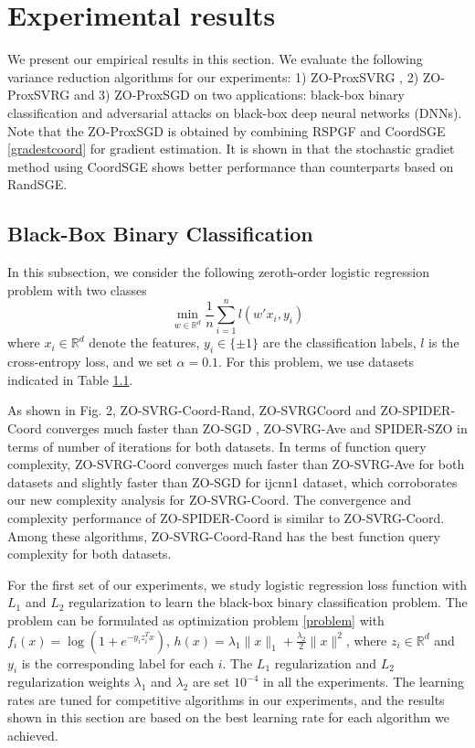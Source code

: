 \documentclass{article}
\newcommand*{\R}{\mathbb{R}}
\theoremstyle{definition}
\theoremstyle{remark}
\begin{document}
\section{Experimental results}

We present our empirical results in this section. We evaluate the following variance reduction algorithms for our experiments: 1) ZO-ProxSVRG \cite{Johnson12}, 2) ZO-ProxSVRG\cite{pedregosa2017breaking} and 3) ZO-ProxSGD on two applications: black-box binary classification and adversarial attacks on black-box deep neural networks
(DNNs). Note that the ZO-ProxSGD is obtained by combining RSPGF and CoordSGE \eqref{gradestcoord} for gradient estimation. It is shown in \cite{huang2019faster} that the stochastic gradiet method using CoordSGE shows better performance than counterparts based on RandSGE.


\subsection{Black-Box Binary Classification}
{\color{Melon}
In this subsection, we consider the following zeroth-order logistic regression problem with two classes 
\[
\min_{w\in\R^d} \frac{1}{n}\sum_{i=1}^n l(w'x_i, y_i)
\]
where $x_i\in\R^d$ denote the features, $y_i\in\{\pm 1\}$ are the classification labels, $l$ is the cross-entropy loss, and we
set $\alpha = 0.1$. For this problem, we use datasets indicated in Table \ref{}. 

As shown in Fig. 2, ZO-SVRG-Coord-Rand, ZO-SVRGCoord
and ZO-SPIDER-Coord converges much faster than
ZO-SGD , ZO-SVRG-Ave and SPIDER-SZO in terms of
number of iterations for both datasets. In terms of function
query complexity, ZO-SVRG-Coord converges much faster
than ZO-SVRG-Ave for both datasets and slightly faster
than ZO-SGD for ijcnn1 dataset, which corroborates our
new complexity analysis for ZO-SVRG-Coord. The convergence
and complexity performance of ZO-SPIDER-Coord
is similar to ZO-SVRG-Coord. Among these algorithms,
ZO-SVRG-Coord-Rand has the best function query complexity
for both datasets.
}
For the first set of our experiments, we study logistic regression loss function with $L_1$ and $L_2$ regularization {\color{Green} to learn the black-box binary classification problem}. The problem can be formulated as optimization problem \eqref{problem} with $f_i(x) = \log(1+e^{-y_iz^T_i{x}})$, $h(x) = \lambda_1\|{x}\|_1 + \frac{\lambda_2}{2}\|{x}\|^2$, where $z_i\in\R^d$ and $y_i$ is the corresponding label for each $i$. The $L_1$ regularization and $L_2$ regularization weights $\lambda_1$ and $\lambda_2$ are set $10^{-4}$ in all the experiments. The learning rates are tuned for competitive algorithms in our experiments, and the results shown in this section are based on the best learning rate for each algorithm we achieved.
\end{document}
